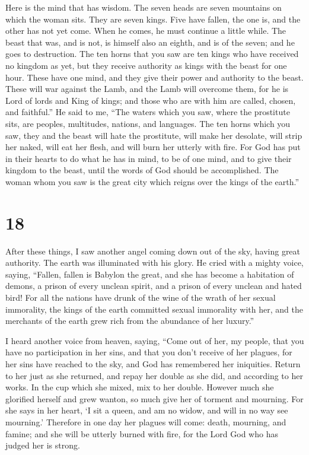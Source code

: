  Here is the mind that has wisdom. The seven heads are
seven mountains on which the woman sits.  They are seven
kings. Five have fallen, the one is, and the other has not yet come.
When he comes, he must continue a little while.  The
beast that was, and is not, is himself also an eighth, and is of the
seven; and he goes to destruction.  The ten horns that
you saw are ten kings who have received no kingdom as yet, but they
receive authority as kings with the beast for one hour. 
These have one mind, and they give their power and authority to the
beast.  These will war against the Lamb, and the Lamb
will overcome them, for he is Lord of lords and King of kings; and those
who are with him are called, chosen, and faithful.''  He
said to me, ``The waters which you saw, where the prostitute sits, are
peoples, multitudes, nations, and languages.  The ten
horns which you saw, they and the beast will hate the prostitute, will
make her desolate, will strip her naked, will eat her flesh, and will
burn her utterly with fire.  For God has put in their
hearts to do what he has in mind, to be of one mind, and to give their
kingdom to the beast, until the words of God should be accomplished.
 The woman whom you saw is the great city which reigns
over the kings of the earth.''

\hypertarget{section-17}{%
\section{18}\label{section-17}}

 After these things, I saw another angel coming down out
of the sky, having great authority. The earth was illuminated with his
glory.  He cried with a mighty voice, saying, ``Fallen,
fallen is Babylon the great, and she has become a habitation of demons,
a prison of every unclean spirit, and a prison of every unclean and
hated bird!  For all the nations have drunk of the wine of
the wrath of her sexual immorality, the kings of the earth committed
sexual immorality with her, and the merchants of the earth grew rich
from the abundance of her luxury.''

 I heard another voice from heaven, saying, ``Come out of
her, my people, that you have no participation in her sins, and that you
don't receive of her plagues,  for her sins have reached
to the sky, and God has remembered her iniquities.  Return
to her just as she returned, and repay her double as she did, and
according to her works. In the cup which she mixed, mix to her double.
 However much she glorified herself and grew wanton, so
much give her of torment and mourning. For she says in her heart, `I sit
a queen, and am no widow, and will in no way see mourning.'
 Therefore in one day her plagues will come: death,
mourning, and famine; and she will be utterly burned with fire, for the
Lord God who has judged her is strong.

